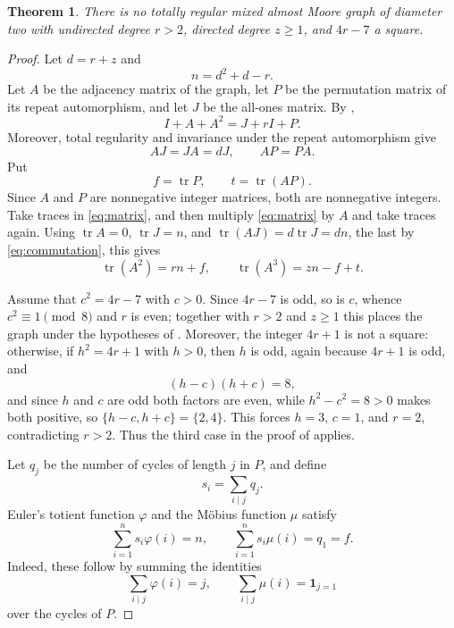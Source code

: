 \documentclass[11pt]{amsart}
\newtheorem{theorem}{Theorem}
\DeclareMathOperator{\tr}{tr}
\begin{document}
\begin{theorem}\label{thm:main}
There is no totally regular mixed almost Moore graph of diameter two
with undirected degree $r>2$, directed degree $z\geq 1$, and $4r-7$
a square.
\end{theorem}

\begin{proof}
Let $d=r+z$ and
\[
  n=d^2+d-r.
\]
Let $A$ be the adjacency matrix of the graph, let $P$ be the
permutation matrix of its repeat automorphism, and let $J$ be the
all-ones matrix. By \cite[Eq.~(1)]{LM},
\begin{equation}\label{eq:matrix}
  I+A+A^2=J+rI+P.
\end{equation}
Moreover, total regularity and invariance under the repeat
automorphism give
\begin{equation}\label{eq:commutation}
  AJ=JA=dJ,
  \qquad
  AP=PA.
\end{equation}
Put
\[
  f=\tr P,
  \qquad
  t=\tr(AP).
\]
Since $A$ and $P$ are nonnegative integer matrices, both are
nonnegative integers. Take traces in \eqref{eq:matrix}, and then
multiply \eqref{eq:matrix} by $A$ and take traces again. Using
$\tr A=0$, $\tr J=n$, and $\tr(AJ)=d\tr J=dn$, the last by
\eqref{eq:commutation}, this gives
\begin{equation}\label{eq:combinatorial-traces}
  \tr(A^2)=rn+f,
  \qquad
  \tr(A^3)=zn-f+t.
\end{equation}

Assume that $c^2=4r-7$ with $c>0$. Since $4r-7$ is odd, so is $c$,
whence $c^2\equiv1\pmod 8$ and
$r$ is even; together with $r>2$ and $z\geq 1$ this places the
graph under the hypotheses of \cite[Theorem~2]{LM}. Moreover, the
integer $4r+1$ is not a square: otherwise, if $h^2=4r+1$ with $h>0$,
then $h$ is odd, again because $4r+1$ is odd, and
\[
  (h-c)(h+c)=8,
\]
and since $h$ and $c$ are odd both factors are even, while
$h^2-c^2=8>0$ makes both positive, so $\{h-c,h+c\}=\{2,4\}$. This
forces $h=3$, $c=1$, and $r=2$, contradicting $r>2$. Thus the third
case in the proof of \cite[Theorem~2]{LM} applies.

Let $q_j$ be the number of cycles of length $j$ in $P$, and define
\[
  s_i=\sum_{i\mid j}q_j.
\]
Euler's totient function $\varphi$ and the M\"obius function $\mu$
satisfy
\begin{equation}\label{eq:mobius-identities}
  \sum_{i=1}^{n}s_i\varphi(i)=n,
  \qquad
  \sum_{i=1}^{n}s_i\mu(i)=q_1=f.
\end{equation}
Indeed, these follow by summing the identities
\[
  \sum_{i\mid j}\varphi(i)=j,
  \qquad
  \sum_{i\mid j}\mu(i)=\mathbf{1}_{j=1}
\]
over the cycles of $P$.


\end{proof}
\end{document}
